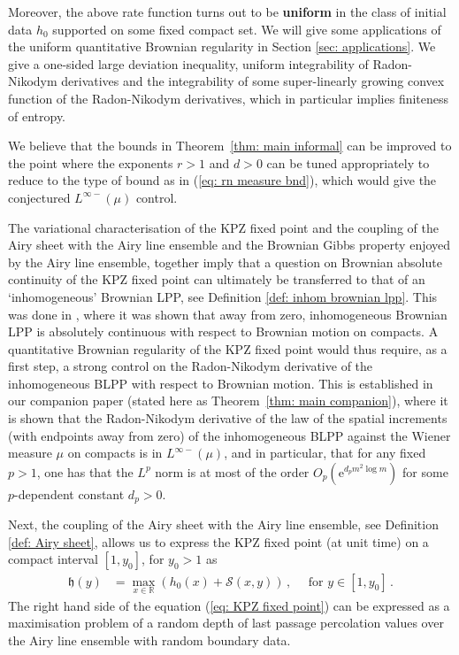 \documentclass[11pt, reqno]{amsart}
\numberwithin{equation}{section}
\newcommand{\R}{\ensuremath{\mathbb{R}}}
\begin{document}
Moreover, the above rate function turns out to be \textbf{uniform} in the class of initial data $h_0$ supported on some fixed compact set. We will give some applications of the uniform quantitative Brownian regularity in Section \ref{sec: applications}. We give a one-sided large deviation inequality, uniform integrability of Radon-Nikodym derivatives and the integrability of some super-linearly growing convex function of the Radon-Nikodym derivatives, which in particular implies finiteness of entropy.

We believe that the bounds in Theorem~\ref{thm: main informal} can be improved to the point where the exponents $r>1$ and $d>0$ can be tuned appropriately to reduce to the type of bound as in (\ref{eq: rn measure bnd}), which would give the conjectured $L^{\infty-}(\mu)$ control.

The variational characterisation of the KPZ fixed point and the coupling of the Airy sheet with the Airy line ensemble and the Brownian Gibbs property enjoyed by the Airy line ensemble, together imply that a question on Brownian absolute continuity of the KPZ fixed point can ultimately be transferred to that of an `inhomogeneous' Brownian LPP, see Definition \ref{def: inhom brownian lpp}. This was done in \cite[Theorem~4.3]{sarkar2021brownian}, where it was shown that away from zero, inhomogeneous Brownian LPP is absolutely continuous with respect to Brownian motion on compacts. A quantitative Brownian regularity of the KPZ fixed point would thus require, as a first step, a strong control on the Radon-Nikodym derivative of the inhomogeneous BLPP with respect to Brownian motion. This is established in our companion paper \cite[Theorem~7.1]{tassopoulos2025inhomogeneousbrownian} (stated here as Theorem~\ref{thm: main companion}), where it is shown that the Radon-Nikodym derivative of the law of the spatial increments (with endpoints away from zero) of the inhomogeneous BLPP  against the Wiener measure $\mu$ on compacts is in $L^{\infty-}(\mu)$, and in particular, that for any fixed $p>1$, one has that the $L^p$ norm is at most of the order $O_p(\mathrm{e}^{d_pm^2\log m})$ for some $p$-dependent constant $d_p>0$.



Next, the coupling of the Airy sheet with the Airy line ensemble, see Definition \ref{def: Airy sheet}, allows us to express the KPZ fixed point (at unit time) on a compact interval $[1,y_0]$, for $y_0>1$ as 
\begin{equation}\label{eq: KPZ fixed point}
\begin{array}{ll}
    \mathfrak{h}(y) &= \displaystyle\max_{x\in \R}(h_0(x)+\mathcal{S}(x,y))\,,  \quad \text{ for } y\in [1,y_0] \,.
\end{array}
\end{equation}
The right hand side of the equation (\ref{eq: KPZ fixed point}) can be expressed as a maximisation problem of a random depth of last passage percolation values over the Airy line ensemble with random boundary data. 
\end{document}

